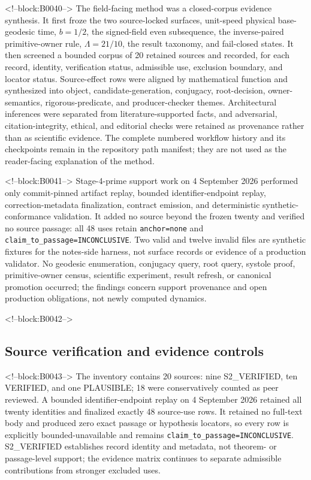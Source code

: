 \documentclass[11pt,a4paper]{article}
\begin{document}
<!--block:B0040-->
The field-facing method was a closed-corpus evidence synthesis. It first froze the two source-locked surfaces, unit-speed physical base-geodesic time, \(b=1/2\), the signed-field even subsequence, the inverse-paired primitive-owner rule, \(\Lambda=21/10\), the result taxonomy, and fail-closed states. It then screened a bounded corpus of 20 retained sources and recorded, for each record, identity, verification status, admissible use, exclusion boundary, and locator status. Source-effect rows were aligned by mathematical function and synthesized into object, candidate-generation, conjugacy, root-decision, owner-semantics, rigorous-predicate, and producer-checker themes. Architectural inferences were separated from literature-supported facts, and adversarial, citation-integrity, ethical, and editorial checks were retained as provenance rather than as scientific evidence. The complete numbered workflow history and its checkpoints remain in the repository path manifest; they are not used as the reader-facing explanation of the method.

<!--block:B0041-->
Stage-4-prime support work on 4 September 2026 performed only commit-pinned artifact replay, bounded identifier-endpoint replay, correction-metadata finalization, contract emission, and deterministic synthetic-conformance validation. It added no source beyond the frozen twenty and verified no source passage: all 48 uses retain \texttt{anchor=none} and \texttt{claim\_to\_passage=INCONCLUSIVE}. Two valid and twelve invalid files are synthetic fixtures for the notes-side harness, not surface records or evidence of a production validator. No geodesic enumeration, conjugacy query, root query, systole proof, primitive-owner census, scientific experiment, result refresh, or canonical promotion occurred; the findings concern support provenance and open production obligations, not newly computed dynamics.

<!--block:B0042-->
\hypertarget{source-verification-and-evidence-controls}{%
\subsection{Source verification and evidence controls}\label{source-verification-and-evidence-controls}}

<!--block:B0043-->
The inventory contains 20 sources: nine S2\_VERIFIED, ten VERIFIED, and one PLAUSIBLE; 18 were conservatively counted as peer reviewed. A bounded identifier-endpoint replay on 4 September 2026 retained all twenty identities and finalized exactly 48 source-use rows. It retained no full-text body and produced zero exact passage or hypothesis locators, so every row is explicitly bounded-unavailable and remains \texttt{claim\_to\_passage=INCONCLUSIVE}. S2\_VERIFIED establishes record identity and metadata, not theorem- or passage-level support; the evidence matrix continues to separate admissible contributions from stronger excluded uses.
\end{document}

